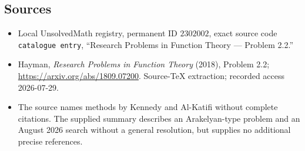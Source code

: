 \documentclass[11pt]{article}
\begin{document}
\subsection{Sources}
\begin{itemize}
\item Local UnsolvedMath registry, permanent ID \(2302002\), exact source code \texttt{catalogue entry}, ``Research Problems in Function Theory --- Problem 2.2.''
\item Hayman, \emph{Research Problems in Function Theory} (2018), Problem 2.2; \url{https://arxiv.org/abs/1809.07200}. Source-TeX extraction; recorded access 2026-07-29.
\item The source names methods by Kennedy and Al-Katifi without complete citations. The supplied summary describes an Arakelyan-type problem and an August 2026 search without a general resolution, but supplies no additional precise references.
\end{itemize}
\end{document}
